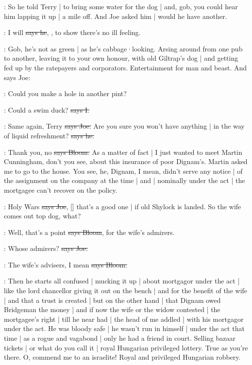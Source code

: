 \Nq:
So he told Terry |
to bring some water for the dog |
and,
gob,
you could hear him lapping it up |
a mile off.
And Joe asked him |
would he have another.%

\citizen:
I will
\sout{says he},
,
to show there's no ill feeling.

\Nq:
Gob,
he's not as green |
as he's cabbage·looking.
Arsing around from one pub to another,
leaving it to your own honour,
with old Giltrap's dog |
and getting fed up by the ratepayers and corporators.
Entertainment for man and beast.
And says Joe:

\joe:
Could you make a hole in another pint?

:
Could a swim duck?
\sout{says I.}

\joe:
Same again,
Terry
\sout{says Joe.}
Are you sure you won't have anything |
in the way of liquid refreshment?
\sout{says he.}

\Bloom:
Thank you,
no
\sout{says Bloom.}
As a matter of fact |
I just wanted to meet Martin Cunningham,
don't you see,
about this insurance of poor Dignam's.
Martin asked me to go to the house.
You see,
he,
Dignam,
I mean,
didn't serve any notice |
of the assignment on the company at the time |
and |
nominally under the act |
the mortgagee can't recover on the policy.

\joe:
Holy Wars
\sout{says Joe},
[]
that's a good one |
if old Shylock is landed.
So the wife comes out top dog,
what?

\Bloom:
Well,
that's a point
\sout{says Bloom},
for the wife's admirers.

\joe:
Whose admirers?
\sout{says Joe.}

\Bloom:
The wife's advisers,
I mean
\sout{says Bloom.}

\Nq:
Then he starts all confused
 |
mucking it up |
about mortgagor under the act |
like the lord chancellor giving it out on the bench |
and for the benefit of the wife |
and that a trust is created |
but on the other hand |
that Dignam owed Bridgeman the money |
and if now the wife or the widow contested |
the mortgagee's right |
till he near had |
the head of me addled |
with his mortgagor under the act.
He was bloody safe |
he wasn't run in himself |
under the act that time |
as a rogue and vagabond |
only he had a friend in court.
Selling bazaar tickets |
or what do you call it |
royal Hungarian privileged lottery.
True as you're there.
O,
commend me to an israelite!
Royal and privileged Hungarian robbery.

